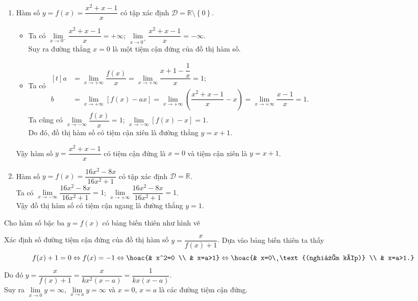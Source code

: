 \begin{bt}
{\begin{enumerate}
			\item Hàm số $y=f(x)=\dfrac{x^{2}+x-1}{x}$ có tập xác định $\mathscr{D}=\mathbb{R} \setminus \left\lbrace 0\right\rbrace$.
			\begin{itemize}
				\item Ta có $\lim\limits_{x \rightarrow 0^{-}} \dfrac{x^{2}+x-1}{x}=+\infty$; $\lim\limits_{x \rightarrow 0^{+}} \dfrac{x^{2}+x-1}{x}=-\infty$.\\
				Suy ra đường thẳng $x=0$ là một tiệm cận đứng của đồ thị hàm số.
				\item Ta có $\begin{aligned}[t]
					a&=\lim\limits_{x \rightarrow+\infty} \dfrac{f(x)}{x}=\lim\limits_{x \rightarrow+\infty} \dfrac{x+1-\dfrac{1}{x}}{x}=1;\\
					b&=\lim\limits_{x \rightarrow+\infty}[f(x)-ax]=\lim\limits_{x \rightarrow+\infty}\left(\dfrac{x^{2}+x-1}{x}-x\right)=\lim\limits_{x \rightarrow+\infty} \dfrac{x-1}{x}=1.
				\end{aligned}$\\
				Ta cũng có $\lim\limits_{x \rightarrow-\infty} \dfrac{f(x)}{x}=1$; $\lim\limits_{x \rightarrow-\infty}[f(x)-x]=1$.\\
				Do đó, đồ thị hàm số có tiệm cận xiên là đường thẳng $y=x+1$.
			\end{itemize}
			Vậy hàm số $y=\dfrac{x^{2}+x-1}{x}$ có tiệm cận đứng là $x=0$ và tiệm cận xiên là $y=x+1$.
			\item Hàm số $y=f(x)=\dfrac{16x^{2}-8x}{16x^{2}+1}$ có tập xác định $\mathscr{D}=\mathbb{R}$.\\
			Ta có $\lim\limits_{x \rightarrow -\infty} \dfrac{16x^{2}-8x}{16x^{2}+1}=1$; $\lim\limits_{x \rightarrow+\infty} \dfrac{16x^{2}-8x}{16x^{2}+1}=1$.\\
			Vậy đồ thị hàm số có tiệm cận ngang là đường thẳng $y=1$.
		\end{enumerate}
	}
\end{bt}

\begin{bt}%
	Cho hàm số bậc ba $y=f(x)$ có bảng biến thiên như hình vẽ
	\begin{center}
	\end{center}
	Xác định số đường tiệm cận đứng của đồ thị hàm số $y=\dfrac{x}{f(x)+1}$.
	\loigiai
	{
		Dựa vào bảng biến thiên ta thấy
		$$f(x)+1=0\Leftrightarrow f(x)=-1\Leftrightarrow \hoac{& x^2=0 \\ & x=a>1}\Leftrightarrow\hoac{& x=0\ \text{(nghiệm kép)} \\ & x=a>1.}$$
		Do đó $y=\dfrac{x}{f(x)+1}=\dfrac{x}{kx^2(x-a)}=\dfrac{1}{kx(x-a)}$.\\
		Suy ra $\lim \limits_{x \to 0} y=\infty$, $\lim \limits_{x \to a} y=\infty$ và $x=0$, $x=a$ là các đường tiệm cận đứng.
	}
\end{bt}

